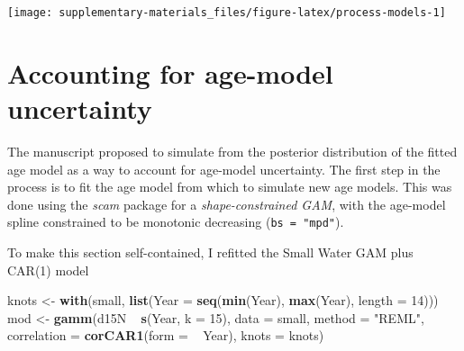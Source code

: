 \documentclass[12pt,]{article}
\newenvironment{Shaded}{\begin{snugshade}}{\end{snugshade}}
\newcommand{\KeywordTok}[1]{\textcolor[rgb]{0.13,0.29,0.53}{\textbf{{#1}}}}
\newcommand{\DataTypeTok}[1]{\textcolor[rgb]{0.13,0.29,0.53}{{#1}}}
\newcommand{\DecValTok}[1]{\textcolor[rgb]{0.00,0.00,0.81}{{#1}}}
\newcommand{\StringTok}[1]{\textcolor[rgb]{0.31,0.60,0.02}{{#1}}}
\newcommand{\NormalTok}[1]{{#1}}
\begin{document}
\begin{Shaded}
\end{Shaded}

\begin{center}\texttt{[image: supplementary-materials\_files/figure-latex/process-models-1]} \end{center}

\section{Accounting for age-model
uncertainty}\label{accounting-for-age-model-uncertainty}

The manuscript proposed to simulate from the posterior distribution of
the fitted age model as a way to account for age-model uncertainty. The
first step in the process is to fit the age model from which to simulate
new age models. This was done using the \emph{scam} package for a
\emph{shape-constrained GAM}, with the age-model spline constrained to
be monotonic decreasing (\texttt{bs\ =\ "mpd"}).

To make this section self-contained, I refitted the Small Water GAM plus
CAR(1) model

\begin{Shaded}
\begin{Highlighting}[]
\NormalTok{knots <-}\StringTok{ }\KeywordTok{with}\NormalTok{(small, }\KeywordTok{list}\NormalTok{(}\DataTypeTok{Year =} \KeywordTok{seq}\NormalTok{(}\KeywordTok{min}\NormalTok{(Year), }\KeywordTok{max}\NormalTok{(Year), }\DataTypeTok{length =} \DecValTok{14}\NormalTok{)))}
\NormalTok{mod <-}\StringTok{ }\KeywordTok{gamm}\NormalTok{(d15N ~}\StringTok{ }\KeywordTok{s}\NormalTok{(Year, }\DataTypeTok{k =} \DecValTok{15}\NormalTok{), }\DataTypeTok{data =} \NormalTok{small, }\DataTypeTok{method =} \StringTok{"REML"}\NormalTok{,}
            \DataTypeTok{correlation =} \KeywordTok{corCAR1}\NormalTok{(}\DataTypeTok{form =} \NormalTok{~}\StringTok{ }\NormalTok{Year),}
            \DataTypeTok{knots =} \NormalTok{knots)}
\end{Highlighting}
\end{Shaded}
\end{document}
